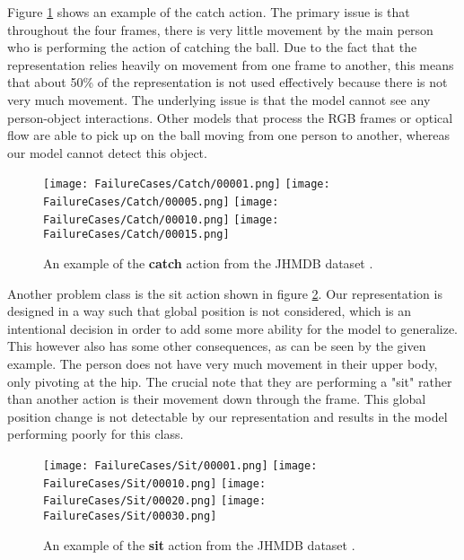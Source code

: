 Figure \ref{fig:catch-action} shows an example of the catch action. The primary issue is that throughout the four frames, there is very little movement by the main person who is performing the action of catching the ball. Due to the fact that the representation relies heavily on movement from one frame to another, this means that about 50\% of the representation is not used effectively because there is not very much movement. The underlying issue is that the model cannot see any person-object interactions. Other models that process the RGB frames or optical flow are able to pick up on the ball moving from one person to another, whereas our model cannot detect this object.

\begin{figure}[ht]
	\texttt{[image: FailureCases/Catch/00001.png]}
	\texttt{[image: FailureCases/Catch/00005.png]}
	\texttt{[image: FailureCases/Catch/00010.png]}
	\texttt{[image: FailureCases/Catch/00015.png]}
	\centering
	\caption{An example of the \textbf{catch} action from the JHMDB dataset \cite{JHMDB}.}
	\label{fig:catch-action}
\end{figure}

Another problem class is the sit action shown in figure \ref{fig:sit-action}. Our representation is designed in a way such that global position is not considered, which is an intentional decision in order to add some more ability for the model to generalize. This however also has some other consequences, as can be seen by the given example. The person does not have very much movement in their upper body, only pivoting at the hip. The crucial note that they are performing a "sit" rather than another action is their movement down through the frame. This global position change is not detectable by our representation and results in the model performing poorly for this class.

\begin{figure}[ht]
	\texttt{[image: FailureCases/Sit/00001.png]}
	\texttt{[image: FailureCases/Sit/00010.png]}
	\texttt{[image: FailureCases/Sit/00020.png]}
	\texttt{[image: FailureCases/Sit/00030.png]}
	\centering
	\caption{An example of the \textbf{sit} action from the JHMDB dataset \cite{JHMDB}.}
	\label{fig:sit-action}
\end{figure}

